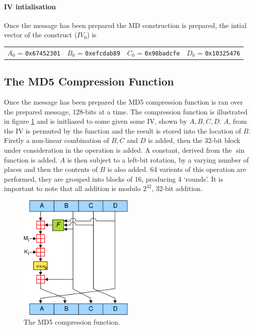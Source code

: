 \documentclass[a4paper,12pt]{article}
\begin{document}
\paragraph{IV intialisation}
Once the message has been prepared the MD construction is prepared, the intial vector of the construct ($IV_0$) is

\begin{tabular}{ l l l l}
	$A_0$ = \texttt{0x67452301}& $B_0$ = \texttt{0xefcdab89}& $C_0$ = \texttt{0x98badcfe}& $D_0$ = \texttt{0x10325476}
\end{tabular}

\subsection{The MD5 Compression Function}
Once the message has been prepared the MD5 compression function is ran over the prepared message, 128-bits at a time. The compression function is illustrated in figure \ref{fig:md5comp} and is initliased to some given some IV, shown by $A, B, C, D$. $A$, from the IV is permuted by the function and the result is stored into the location of $B$. Firstly a non-linear combination of $B, C$ and $D$ is added, then the 32-bit block under consideration in the operation is added. A constant, derived from the $\sin$ function is added. $A$ is then subject to a left-bit rotation, by a varying number of places and then the contents of $B$ is also added. 64 varients of this operation are performed, they are grouped into blocks of 16, producing 4 `rounds'. It is important to note that all addition is modulo $2^{32}$, 32-bit addition.
\begin{figure}
    \centering
    \includegraphics[width=0.5\textwidth]{md5.png}
    \caption{The MD5 compression function.}
    \label{fig:md5comp}
\end{figure}
\end{document}
